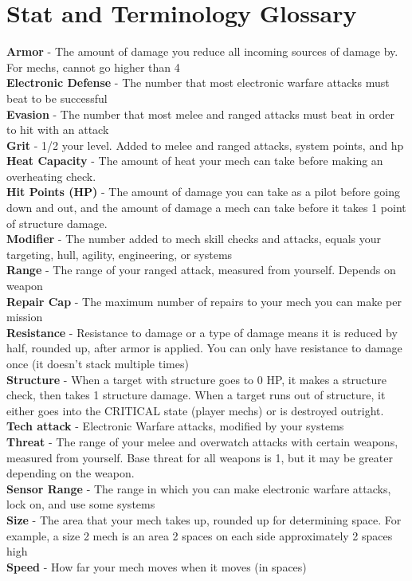 \section{Stat and Terminology Glossary}

\textbf{Armor} - The amount of damage you reduce all incoming sources of damage by. For mechs, cannot go higher than 4\\
\textbf{Electronic Defense} - The number that most electronic warfare attacks must beat to be successful\\
\textbf{Evasion} - The number that most melee and ranged attacks must beat in order to hit with an attack\\
\textbf{Grit} - 1/2 your level. Added to melee and ranged attacks, system points, and hp\\
\textbf{Heat Capacity} - The amount of heat your mech can take before making an overheating check.\\
\textbf{Hit Points (HP)} - The amount of damage you can take as a pilot before going down and out, and the amount of damage a mech can take before it takes 1 point of structure damage.\\
\textbf{Modifier} - The number added to mech skill checks and attacks, equals your targeting, hull, agility, engineering, or systems\\
\textbf{Range} - The range of your ranged attack, measured from yourself. Depends on weapon\\
\textbf{Repair Cap} - The maximum number of repairs to your mech you can make per mission\\
\textbf{Resistance} - Resistance to damage or a type of damage means it is reduced by half, rounded up, after armor is applied. You can only have resistance to damage once (it doesn't stack multiple times)\\
\textbf{Structure} - When a target with structure goes to 0 HP, it makes a structure check, then takes 1 structure damage. When a target runs out of structure, it either goes into the CRITICAL state (player mechs) or is destroyed outright.\\
\textbf{Tech attack} - Electronic Warfare attacks, modified by your systems\\
\textbf{Threat} - The range of your melee and overwatch attacks with certain weapons, measured from yourself. Base threat for all weapons is 1, but it may be greater depending on the weapon.\\
\textbf{Sensor Range} - The range in which you can make electronic warfare attacks, lock on, and use some systems\\
\textbf{Size} - The area that your mech takes up, rounded up for determining space. For example, a size 2 mech is an area 2 spaces on each side approximately 2 spaces high\\
\textbf{Speed} - How far your mech moves when it moves (in spaces)